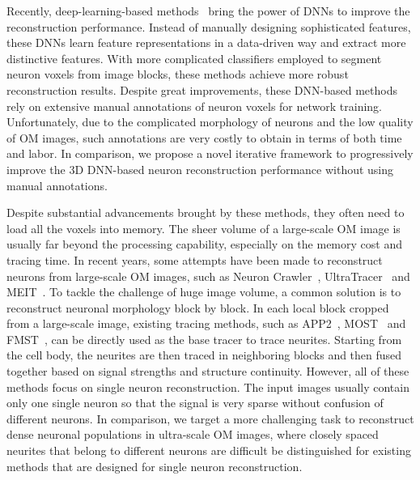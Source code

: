 Recently, deep-learning-based methods~\cite{Li2017, Zhou2018, Xu2016,Kozinski-MIA2020} bring the power of DNNs to improve the reconstruction performance. 
Instead of manually designing sophisticated features, these DNNs learn feature representations in a data-driven way and extract more distinctive features. 
With more complicated classifiers employed to segment neuron voxels from image blocks, these methods achieve more robust reconstruction results. 
Despite great improvements, these DNN-based methods rely on extensive manual annotations of neuron voxels for network training.
Unfortunately, due to the complicated morphology of neurons and the low quality of OM images, such annotations are very costly to obtain in terms of both time and labor.
%
In comparison, we propose a novel iterative framework to progressively improve the 3D DNN-based neuron reconstruction performance without using manual annotations.



Despite substantial advancements brought by these methods, they often need to load all the voxels into memory.
The sheer volume of a large-scale OM image is usually far beyond the processing capability, especially on the memory cost and tracing time.
%
In recent years, some attempts have been made to reconstruct neurons from large-scale OM images, such as Neuron Crawler~\cite{Zhou2015}, UltraTracer~\cite{Peng2017} and MEIT~\cite{Wang2018}.
To tackle the challenge of huge image volume, a common solution is to reconstruct neuronal morphology block by block. 
In each local block cropped from a large-scale image, existing tracing methods, such as APP2~\cite{Xiao2013}, MOST~\cite{Wu2014} and FMST~\cite{Yang2019}, can be directly used as the base tracer to trace neurites. 
Starting from the cell body, the neurites are then traced in neighboring blocks and then fused together based on signal strengths and structure continuity.
%
However, all of these methods focus on single neuron reconstruction.
The input images usually contain only one single neuron so that the signal is very sparse without confusion of different neurons. 
%
In comparison, we target a more challenging task to reconstruct dense neuronal populations in ultra-scale OM images, where closely spaced neurites that belong to different neurons are difficult be distinguished for existing methods that are designed for single neuron reconstruction.

